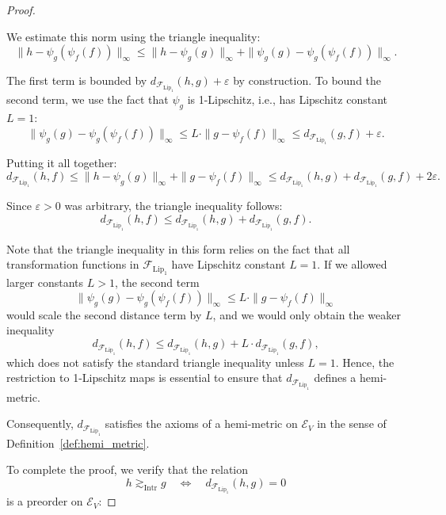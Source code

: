 \begin{proof}
\begin{itemize}
		We estimate this norm using the triangle inequality:
		\[
		\| h - \psi_g(\psi_f(f)) \|_\infty 
		\leq \| h - \psi_g(g) \|_\infty + \| \psi_g(g) - \psi_g(\psi_f(f)) \|_\infty.
		\]
		
		The first term is bounded by \(	d_{\mathcal{F}_{\mathrm{Lip}_1}}(h, g) + \varepsilon \) by construction. To bound the second term, we use the fact that \( \psi_g \) is 1-Lipschitz, i.e., has Lipschitz constant \( L = 1 \):
		\[
		\| \psi_g(g) - \psi_g(\psi_f(f)) \|_\infty \leq L \cdot \| g - \psi_f(f) \|_\infty \leq 	d_{\mathcal{F}_{\mathrm{Lip}_1}}(g, f) + \varepsilon.
		\]
		
		Putting it all together:
		\[
		d_{\mathcal{F}_{\mathrm{Lip}_1}}(h, f) \leq \| h - \psi_g(g) \|_\infty + \| g - \psi_f(f) \|_\infty 
		\leq d_{\mathcal{F}_{\mathrm{Lip}_1}}(h, g) +  d_{\mathcal{F}_{\mathrm{Lip}_1}}(g, f) + 2\varepsilon.
		\]
		
		Since \( \varepsilon > 0 \) was arbitrary, the triangle inequality follows:
		\[
		 d_{\mathcal{F}_{\mathrm{Lip}_1}}(h, f) \leq  d_{\mathcal{F}_{\mathrm{Lip}_1}}(h, g) +  d_{\mathcal{F}_{\mathrm{Lip}_1}}(g, f).
		\]
		
	\end{itemize}

	
	Note that the triangle inequality in this form relies on the fact that all transformation functions in \( \mathcal{F}_{\text{Lip}_1} \) have Lipschitz constant \( L = 1 \).  
	If we allowed larger constants \( L > 1 \), the second term 
	\[
	\| \psi_g(g) - \psi_g(\psi_f(f)) \|_\infty \leq L \cdot \| g - \psi_f(f) \|_\infty
	\]
	would scale the second distance term by \(L\), and we would only obtain the weaker inequality
	\[
	 d_{\mathcal{F}_{\mathrm{Lip}_1}}(h, f) \leq  d_{\mathcal{F}_{\mathrm{Lip}_1}}(h, g) + L \cdot  d_{\mathcal{F}_{\mathrm{Lip}_1}}(g, f),
	\]
	which does not satisfy the standard triangle inequality unless \(L = 1\).  
	Hence, the restriction to 1-Lipschitz maps is essential to ensure that \(  d_{\mathcal{F}_{\mathrm{Lip}_1}} \) defines a hemi-metric.
	
	Consequently, \(  d_{\mathcal{F}_{\mathrm{Lip}_1}} \) satisfies the axioms of a hemi-metric on \( \mathcal{E}_V \) in the sense of Definition~\ref{def:hemi_metric}.
	
	To complete the proof, we verify that the relation
	\[
	h \gtrsim_{\mathrm{Intr}} g \quad \Longleftrightarrow \quad  d_{\mathcal{F}_{\mathrm{Lip}_1}}(h, g) = 0
	\]
	is a preorder on \( \mathcal{E}_V \):
	

\end{proof}
